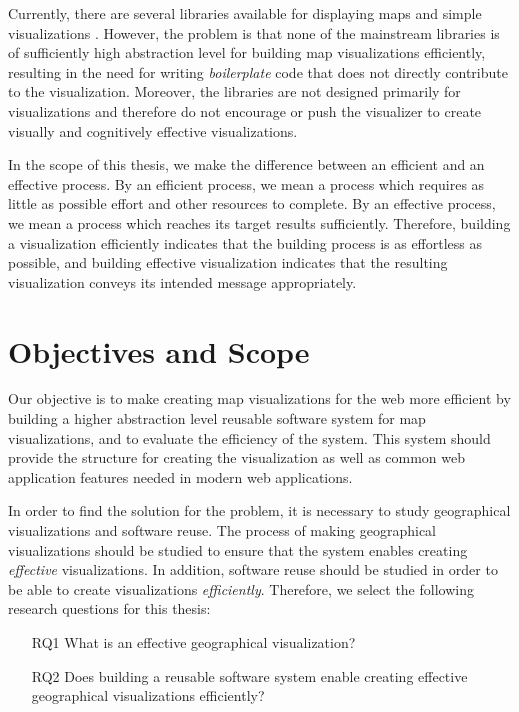 Currently, there are several libraries available for displaying maps and simple visualizations \citep{google_maps_2005,agafonkin_leaflet_2011,metacarta_openlayers_2006}. However, the problem is that none of the mainstream libraries is of sufficiently high abstraction level for building map visualizations efficiently, resulting in the need for writing \emph{boilerplate} code that does not directly contribute to the visualization. Moreover, the libraries are not designed primarily for visualizations and therefore do not encourage or push the visualizer to create visually and cognitively effective visualizations.

In the scope of this thesis, we make the difference between an efficient and an effective process. By an efficient process, we mean a process which requires as little as possible effort and other resources to complete. By an effective process, we mean a process which reaches its target results sufficiently. Therefore, building a visualization efficiently indicates that the building process is as effortless as possible, and building effective visualization indicates that the resulting visualization conveys its intended message appropriately. 

\section{Objectives and Scope}

Our objective is to make creating map visualizations for the web more efficient by building a higher abstraction level reusable software system for map visualizations, and to evaluate the efficiency of the system. This system should provide the structure for creating the visualization as well as common web application features needed in modern web applications.

In order to find the solution for the problem, it is necessary to study geographical visualizations and software reuse. The process of making geographical visualizations should be studied to ensure that the system enables creating \emph{effective} visualizations. In addition, software reuse should be studied in order to be able to create visualizations \emph{efficiently}. Therefore, we select the following research questions for this thesis:

\begin{enumerate}
	\item[RQ1] What is an effective geographical visualization?
	\item[RQ2] Does building a reusable software system enable creating effective geographical visualizations efficiently?
\end{enumerate}

